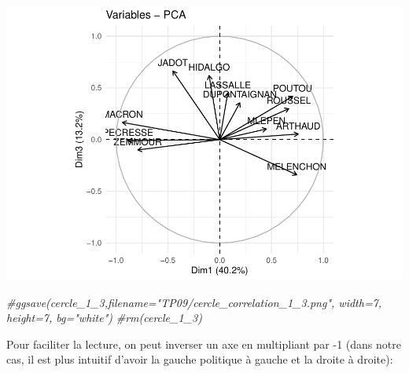 \documentclass[
]{book}
\newenvironment{Shaded}{\begin{snugshade}}{\end{snugshade}}
\newcommand{\AttributeTok}[1]{\textcolor[rgb]{0.13,0.29,0.53}{#1}}
\newcommand{\CommentTok}[1]{\textcolor[rgb]{0.56,0.35,0.01}{\textit{#1}}}
\newcommand{\DecValTok}[1]{\textcolor[rgb]{0.00,0.00,0.81}{#1}}
\newcommand{\FunctionTok}[1]{\textcolor[rgb]{0.13,0.29,0.53}{\textbf{#1}}}
\newcommand{\NormalTok}[1]{#1}
\newcommand{\OtherTok}[1]{\textcolor[rgb]{0.56,0.35,0.01}{#1}}
\newcommand{\SpecialCharTok}[1]{\textcolor[rgb]{0.81,0.36,0.00}{\textbf{#1}}}
\begin{document}
\includegraphics{manuel_geo_quanti_files/figure-latex/unnamed-chunk-63-1.pdf}

\begin{Shaded}
\begin{Highlighting}[]
\CommentTok{\#ggsave(cercle\_1\_3,filename="TP09/cercle\_correlation\_1\_3.png", width=7, height=7, bg="white")}
\CommentTok{\#rm(cercle\_1\_3)}
\end{Highlighting}
\end{Shaded}

Pour faciliter la lecture, on peut inverser un axe en multipliant par -1 (dans notre cas, il est plus intuitif d'avoir la gauche politique à gauche et la droite à droite):

\begin{Shaded}
\end{Shaded}
\end{document}
